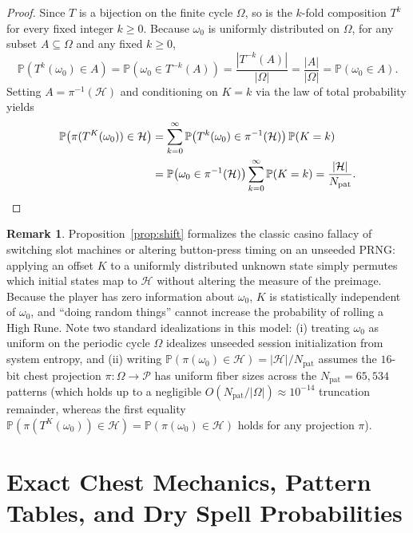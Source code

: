 \documentclass[11pt,reqno]{amsart}
\theoremstyle{definition}
\newtheorem{remark}[theorem]{Remark}
\begin{document}
\begin{proof}
Since $T$ is a bijection on the finite cycle $\Omega$, so is the $k$-fold composition $T^k$ for every fixed integer $k \ge 0$. Because $\omega_0$ is uniformly distributed on $\Omega$, for any subset $A \subseteq \Omega$ and any fixed $k \ge 0$,
\[
    \mathbb{P}\!\left(T^k(\omega_0) \in A\right) = \mathbb{P}\!\left(\omega_0 \in T^{-k}(A)\right) = \frac{|T^{-k}(A)|}{|\Omega|} = \frac{|A|}{|\Omega|} = \mathbb{P}(\omega_0 \in A).
\]
Setting $A = \pi^{-1}(\mathcal{H})$ and conditioning on $K = k$ via the law of total probability yields
\begin{align*}
    \mathbb{P}\!\left(\pi(T^K(\omega_0)) \in \mathcal{H}\right)
    &= \sum_{k=0}^{\infty} \mathbb{P}\!\left(T^k(\omega_0) \in \pi^{-1}(\mathcal{H})\right)\mathbb{P}(K = k) \\
    &= \mathbb{P}\!\left(\omega_0 \in \pi^{-1}(\mathcal{H})\right)\sum_{k=0}^{\infty}\mathbb{P}(K = k) = \frac{|\mathcal{H}|}{N_{\text{pat}}}. \qedhere
\end{align*}
\end{proof}

\begin{remark}
Proposition~\ref{prop:shift} formalizes the classic casino fallacy of switching slot machines or altering button-press timing on an unseeded PRNG: applying an offset $K$ to a uniformly distributed unknown state simply permutes which initial states map to $\mathcal{H}$ without altering the measure of the preimage. Because the player has zero information about $\omega_0$, $K$ is statistically independent of $\omega_0$, and ``doing random things'' cannot increase the probability of rolling a High Rune. Note two standard idealizations in this model: (i) treating $\omega_0$ as uniform on the periodic cycle $\Omega$ idealizes unseeded session initialization from system entropy, and (ii) writing $\mathbb{P}(\pi(\omega_0) \in \mathcal{H}) = |\mathcal{H}| / N_{\text{pat}}$ assumes the $16$-bit chest projection $\pi\colon \Omega \to \mathcal{P}$ has uniform fiber sizes across the $N_{\text{pat}} = 65{,}534$ patterns (which holds up to a negligible $O(N_{\text{pat}}/|\Omega|) \approx 10^{-14}$ truncation remainder, whereas the first equality $\mathbb{P}(\pi(T^K(\omega_0)) \in \mathcal{H}) = \mathbb{P}(\pi(\omega_0) \in \mathcal{H})$ holds for any projection $\pi$).
\end{remark}

\section{Exact Chest Mechanics, Pattern Tables, and Dry Spell Probabilities}
\label{sec:model}
\end{document}
